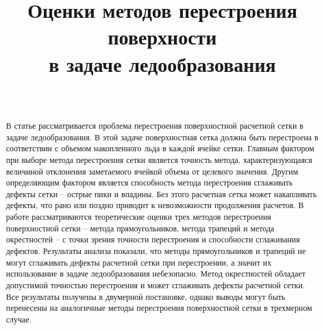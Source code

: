 \documentclass[
11pt,%
tightenlines,%
twoside,%
onecolumn,%
nofloats,%
nobibnotes,%
nofootinbib,%
superscriptaddress,%
noshowpacs,%
centertags]%
{revtex4}
\begin{document}

\title{Оценки методов перестроения поверхности \\ в задаче ледообразования}

\author{~}




\begin{abstract} %
В статье рассматривается проблема перестроения поверхностной расчетной сетки в задаче ледообразования.
В этой задаче поверхностная сетка должна быть перестроена в соответствии с объемом накопленного льда в каждой ячейке сетки.
Главным фактором при выборе метода перестроения сетки является точность метода, характеризующаяся величиной отклонения заметаемого ячейкой объема от целевого значения.
Другим определяющим фактором является способность метода перестроения сглаживать дефекты сетки -- острые пики и впадины.
Без этого расчетная сетка может накапливать дефекты, что рано или поздно приводит к невозможности продолжения расчетов.
В работе рассматриваются теоретические оценки трех методов перестроения поверхностной сетки -- метода прямоугольников, метода трапеций и метода окрестностей -- с точки зрения точности перестроения и способности сглаживания дефектов.
Результаты анализа показали, что методы прямоугольников и трапеций не могут сглаживать дефекты расчетной сетки при перестроении, а значит их использование в задаче ледообразования небезопасно.
Метод окрестностей обладает допустимой точностью перестроения и может сглаживать дефекты расчетной сетки.
Все результаты получены в двумерной постановке, однако выводы могут быть перенесены на аналогичные методы перестроения поверхностной сетки в трехмерном случае.
\end{abstract}
\end{document}

